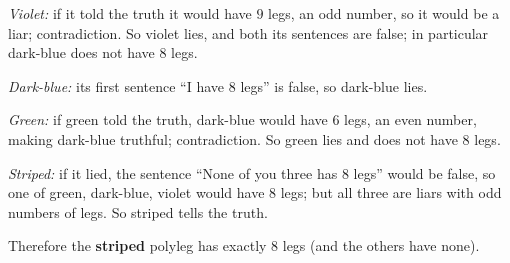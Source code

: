 \emph{Violet:} if it told the truth it would have $9$ legs, an odd number, so it would be a liar; contradiction. So violet lies, and both its sentences are false; in particular dark-blue does not have $8$ legs.

\emph{Dark-blue:} its first sentence ``I have $8$ legs'' is false, so dark-blue lies.

\emph{Green:} if green told the truth, dark-blue would have $6$ legs, an even number, making dark-blue truthful; contradiction. So green lies and does not have $8$ legs.

\emph{Striped:} if it lied, the sentence ``None of you three has $8$ legs'' would be false, so one of green, dark-blue, violet would have $8$ legs; but all three are liars with odd numbers of legs. So striped tells the truth.

Therefore the \textbf{striped} polyleg has exactly $8$ legs (and the others have none).
